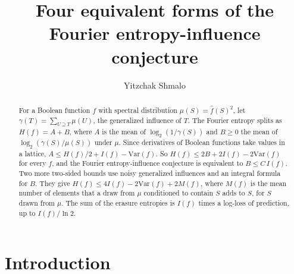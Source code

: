 \documentclass[11pt]{amsart}
\title{Four equivalent forms of the Fourier entropy-influence conjecture}
\author{Yitzchak Shmalo}
\date{}
\theoremstyle{remark}
\newcommand{\Var}{\mathrm{Var}}
\begin{document}
\begin{abstract}
For a Boolean function $f$ with spectral distribution $\mu(S)=\hat f(S)^2$, let $\gamma(T)=\sum_{U\supseteq
T}\mu(U)$, the generalized influence of $T$. The Fourier entropy splits as $H(f)=A+B$, where $A$ is the mean of
$\log_2(1/\gamma(S))$ and $B\ge0$ the mean of $\log_2(\gamma(S)/\mu(S))$ under $\mu$. Since derivatives of Boolean
functions take values in a lattice, $A\le H(f)/2+I(f)-\Var(f)$. So $H(f)\le 2B+2I(f)-2\Var(f)$ for every $f$, and
the Fourier entropy-influence conjecture is equivalent to $B\le C\,I(f)$. Two more two-sided bounds use noisy
generalized influences and an integral formula for $B$. They give $H(f)\le 4I(f)-2\Var(f)+2M(f)$, where $M(f)$ is
the mean number of elements that a draw from $\mu$ conditioned to contain $S$ adds to $S$, for $S$ drawn from $\mu$.
The sum of the erasure entropies is $I(f)$ times a log-loss of prediction, up to $I(f)/\ln 2$.
\end{abstract}


\maketitle

\section{Introduction}\label{sec:intro}
\end{document}
